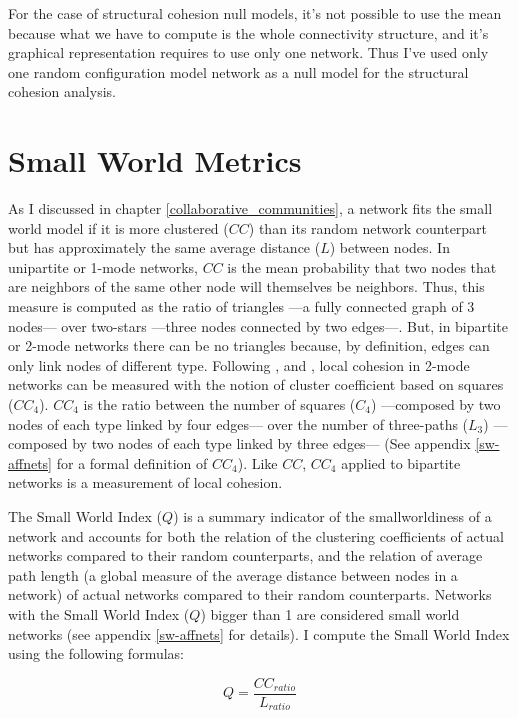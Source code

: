 For the case of structural cohesion null models, it's not possible to use the mean because what we have to compute is the whole connectivity structure, and it's graphical representation requires to use only one network. Thus I've used only one random configuration model network as a null model for the structural cohesion analysis.  

\section{Small World Metrics}

As I discussed in chapter \ref{collaborative_communities}, a network fits the small world model if it is more clustered ($CC$) than its random network counterpart but has approximately the same average distance ($L$) between nodes. In unipartite or 1-mode networks, $CC$ is the mean probability that two nodes that are neighbors of the same other node will themselves be neighbors. Thus, this measure is computed as the ratio of triangles ---a fully connected graph of 3 nodes--- over two-stars ---three nodes connected by two edges---. But, in bipartite or 2-mode networks there can be no triangles because, by definition, edges can only link nodes of different type. Following \citet{robins:2004}, \citet{lind:2005} and \citet{latapy:2008}, local cohesion in 2-mode networks can be measured with the notion of cluster coefficient based on squares ($CC_4$). $CC_4$ is the ratio between the number of squares ($C_4$) ---composed by two nodes of each type linked by four edges--- over the number of three-paths ($L_3$) ---composed by two nodes of each type linked by three edges--- (See appendix \ref{sw-affnets} for a formal definition of $CC_4$). Like $CC$, $CC_4$ applied to bipartite networks is a measurement of local cohesion.

The Small World Index ($Q$) is a summary indicator of the smallworldiness of a network and accounts for both the relation of the clustering coefficients of actual networks compared to their random counterparts, and the relation of average path length (a global measure of the average distance between nodes in a network) of actual networks compared to their random counterparts. Networks with the Small World Index ($Q$) bigger than 1 are considered small world networks (see appendix \ref{sw-affnets} for details). I compute the Small World Index using the following formulas:

\begin{equation}
Q = \frac{CC_{ratio}}{L_{ratio}}
\end{equation}

